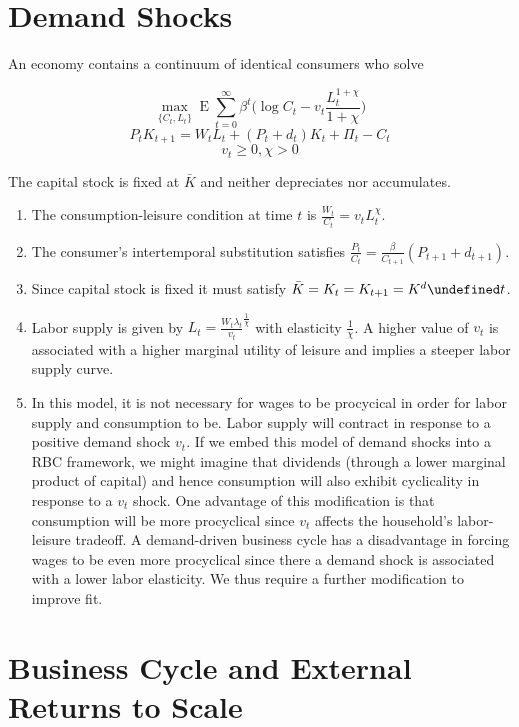 \documentclass[11pt]{article}
\let\oldforall\forall
\let\forall\undefined
\DeclareMathOperator{\forall}{\oldforall}
\DeclareMathOperator{\ev}{E}
\begin{document}
\section{Demand Shocks}

    An economy contains a continuum of identical consumers who solve

        $$ \max_{\{C_t, L_t\}} \ev \sum_{t=0}^\infty \beta^t \bigg ( \log C_t - v_t \frac{L_t^{1+\chi}}{1+\chi} \bigg ) $$
        $$ P_t K_{t+1} = W_t L_t + (P_t + d_t) K_t + \Pi_t - C_t $$
        $$ v_t \geq 0, \chi > 0 $$

    The capital stock is fixed at $\bar K$ and neither depreciates nor accumulates.

    \begin{enumerate}

        \item The consumption-leisure condition at time $t$ is $\frac{W_t}{C_t} = v_t L_t^\chi$.
        \item The consumer's intertemporal substitution satisfies $\frac{P_t}{C_t} = \frac{\beta}{C_{t+1}} (P_{t+1} + d_{t+1})$.
        \item Since capital stock is fixed it must satisfy $\bar K = K_t = K_{t+1} = K^d \forall t$.
        \item Labor supply is given by $L_t = \frac{W_t \lambda_t}{v_t}^\frac{1}{\chi}$ with elasticity $\frac{1}{\chi}$. A higher value of $v_t$ is associated with a higher marginal utility of leisure and implies a steeper labor supply curve.
        \item In this model, it is not necessary for wages to be procycical in order for labor supply and consumption to be. Labor supply will contract in response to a positive demand shock $v_t$. If we embed this model of demand shocks into a RBC framework, we might imagine that dividends (through a lower marginal product of capital) and hence consumption will also exhibit cyclicality in response to a $v_t$ shock. One advantage of this modification is that consumption will be more procyclical since $v_t$ affects the household's labor-leisure tradeoff. A demand-driven business cycle has a disadvantage in forcing wages to be even more procyclical since there a demand shock is associated with a lower labor elasticity. We thus require a further modification to improve fit.

    \end{enumerate}

\section{Business Cycle and External Returns to Scale}
\end{document}
